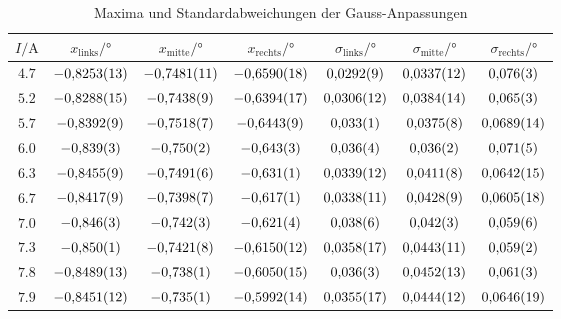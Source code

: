 \begin{table}[htb]
   \centering
\caption{Maxima und Standardabweichungen der Gauss-Anpassungen}
\begin{tabular}{c c c c c c c}
\hline$I / \unit{\ampere}$ & $x_\mathrm{links} / \unit{\degree}$ & $x_\mathrm{mitte} / \unit{\degree}$ & $x_\mathrm{rechts} / \unit{\degree}$ & $\sigma_\mathrm{links} / \unit{\degree}$ & $\sigma_\mathrm{mitte} / \unit{\degree}$ & $\sigma_\mathrm{rechts} / \unit{\degree}$ \\ 
\hline
$\num{4.7}$ & $\num{-0.8253\pm 0.0013}$ & $\num{-0.7481\pm 0.0011}$ & $\num{-0.6590\pm 0.0018}$ & $\num{0.0292\pm 0.0009}$ & $\num{0.0337\pm 0.0012}$ & $\num{0.076\pm 0.003}$ \\
$\num{5.2}$ & $\num{-0.8288\pm 0.0015}$ & $\num{-0.7438\pm 0.0009}$ & $\num{-0.6394\pm 0.0017}$ & $\num{0.0306\pm 0.0012}$ & $\num{0.0384\pm 0.0014}$ & $\num{0.065\pm 0.003}$ \\
$\num{5.7}$ & $\num{-0.8392\pm 0.0009}$ & $\num{-0.7518\pm 0.0007}$ & $\num{-0.6443\pm 0.0009}$ & $\num{0.033\pm 0.001}$ & $\num{0.0375\pm 0.0008}$ & $\num{0.0689\pm 0.0014}$ \\
$\num{6.0}$ & $\num{-0.839\pm 0.003}$ & $\num{-0.750\pm 0.002}$ & $\num{-0.643\pm 0.003}$ & $\num{0.036\pm 0.004}$ & $\num{0.036\pm 0.002}$ & $\num{0.071\pm 0.005}$ \\
$\num{6.3}$ & $\num{-0.8455\pm 0.0009}$ & $\num{-0.7491\pm 0.0006}$ & $\num{-0.631\pm 0.001}$ & $\num{0.0339\pm 0.0012}$ & $\num{0.0411\pm 0.0008}$ & $\num{0.0642\pm 0.0015}$ \\
$\num{6.7}$ & $\num{-0.8417\pm 0.0009}$ & $\num{-0.7398\pm 0.0007}$ & $\num{-0.617\pm 0.001}$ & $\num{0.0338\pm 0.0011}$ & $\num{0.0428\pm 0.0009}$ & $\num{0.0605\pm 0.0018}$ \\
$\num{7.0}$ & $\num{-0.846\pm 0.003}$ & $\num{-0.742\pm 0.003}$ & $\num{-0.621\pm 0.004}$ & $\num{0.038\pm 0.006}$ & $\num{0.042\pm 0.003}$ & $\num{0.059\pm 0.006}$ \\
$\num{7.3}$ & $\num{-0.850\pm 0.001}$ & $\num{-0.7421\pm 0.0008}$ & $\num{-0.6150\pm 0.0012}$ & $\num{0.0358\pm 0.0017}$ & $\num{0.0443\pm 0.0011}$ & $\num{0.059\pm 0.002}$ \\
$\num{7.8}$ & $\num{-0.8489\pm 0.0013}$ & $\num{-0.738\pm 0.001}$ & $\num{-0.6050\pm 0.0015}$ & $\num{0.036\pm 0.003}$ & $\num{0.0452\pm 0.0013}$ & $\num{0.061\pm 0.003}$ \\
$\num{7.9}$ & $\num{-0.8451\pm 0.0012}$ & $\num{-0.735\pm 0.001}$ & $\num{-0.5992\pm 0.0014}$ & $\num{0.0355\pm 0.0017}$ & $\num{0.0444\pm 0.0012}$ & $\num{0.0646\pm 0.0019}$ \\
\hline\end{tabular}
\label{tab:gauss_zeeman_maxima_and_std}
\end{table}